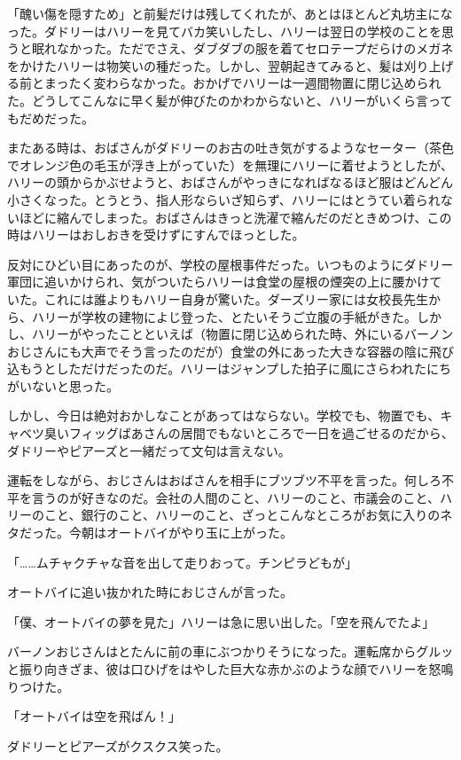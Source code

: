 \documentclass[10pt,a4paper]{article}
\begin{document}
\begin{CJK}{UTF8}{min}
「醜い傷を隠すため」と前髪だけは残してくれたが、あとはほとんど丸坊主になった。ダドリーはハリーを見てバカ笑いしたし、ハリーは翌日の学校のことを思うと眠れなかった。ただでさえ、ダブダブの服を着てセロテープだらけのメガネをかけたハリーは物笑いの種だった。しかし、翌朝起きてみると、髪は刈り上げる前とまったく変わらなかった。おかげでハリーは一週間物置に閉じ込められた。どうしてこんなに早く髪が伸びたのかわからないと、ハリーがいくら言ってもだめだった。

またある時は、おばさんがダドリーのお古の吐き気がするようなセーター（茶色でオレンジ色の毛玉が浮き上がっていた）を無理にハリーに着せようとしたが、ハリーの頭からかぶせようと、おばさんがやっきになればなるほど服はどんどん小さくなった。とうとう、指人形ならいざ知らず、ハリーにはとうてい着られないほどに縮んでしまった。おばさんはきっと洗濯で縮んだのだときめつけ、この時はハリーはおしおきを受けずにすんでほっとした。

反対にひどい目にあったのが、学校の屋根事件だった。いつものようにダドリー軍団に追いかけられ、気がついたらハリーは食堂の屋根の煙突の上に腰かけていた。これには誰よりもハリー自身が驚いた。ダーズリー家には女校長先生から、ハリーが学枚の建物によじ登った、とたいそうご立腹の手紙がきた。しかし、ハリーがやったことといえば（物置に閉じ込められた時、外にいるバーノンおじさんにも大声でそう言ったのだが）食堂の外にあった大きな容器の陰に飛び込もうとしただけだったのだ。ハリーはジャンプした拍子に風にさらわれたにちがいないと思った。

しかし、今日は絶対おかしなことがあってはならない。学校でも、物置でも、キャベツ臭いフィッグばあさんの居間でもないところで一日を過ごせるのだから、ダドリーやピアーズと一緒だって文句は言えない。

運転をしながら、おじさんはおばさんを相手にブツブツ不平を言った。何しろ不平を言うのが好きなのだ。会社の人間のこと、ハリーのこと、市議会のこと、ハリーのこと、銀行のこと、ハリーのこと、ざっとこんなところがお気に入りのネタだった。今朝はオートバイがやり玉に上がった。

「……ムチャクチャな音を出して走りおって。チンピラどもが」

オートバイに追い抜かれた時におじさんが言った。

「僕、オートバイの夢を見た」ハリーは急に思い出した。「空を飛んでたよ」

バーノンおじさんはとたんに前の車にぶつかりそうになった。運転席からグルッと振り向きざま、彼は口ひげをはやした巨大な赤かぶのような顔でハリーを怒鳴りつけた。

「オートバイは空を飛ばん！」

ダドリーとピアーズがクスクス笑った。


\end{CJK}
\end{document}
